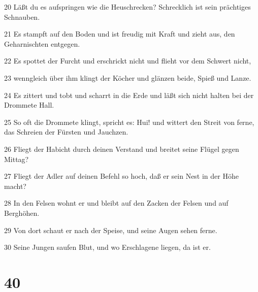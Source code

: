 \par 20 Läßt du es aufspringen wie die Heuschrecken? Schrecklich ist sein prächtiges Schnauben.
\par 21 Es stampft auf den Boden und ist freudig mit Kraft und zieht aus, den Geharnischten entgegen.
\par 22 Es spottet der Furcht und erschrickt nicht und flieht vor dem Schwert nicht,
\par 23 wenngleich über ihm klingt der Köcher und glänzen beide, Spieß und Lanze.
\par 24 Es zittert und tobt und scharrt in die Erde und läßt sich nicht halten bei der Drommete Hall.
\par 25 So oft die Drommete klingt, spricht es: Hui! und wittert den Streit von ferne, das Schreien der Fürsten und Jauchzen.
\par 26 Fliegt der Habicht durch deinen Verstand und breitet seine Flügel gegen Mittag?
\par 27 Fliegt der Adler auf deinen Befehl so hoch, daß er sein Nest in der Höhe macht?
\par 28 In den Felsen wohnt er und bleibt auf den Zacken der Felsen und auf Berghöhen.
\par 29 Von dort schaut er nach der Speise, und seine Augen sehen ferne.
\par 30 Seine Jungen saufen Blut, und wo Erschlagene liegen, da ist er.

\chapter{40}

